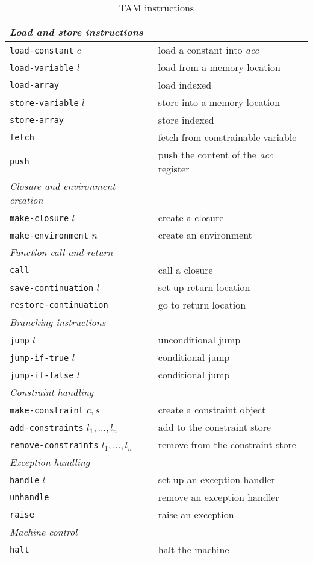 \begin{table}
\begin{center}
\begin{tabular}{|ll|}
\hline
{\em Load and store instructions}&\\
\hline
{\tt load-constant} $c$& load a constant into {\em acc}\\
{\tt load-variable} $l$& load from a memory location\\
{\tt load-array} & load indexed\\
{\tt store-variable} $l$& store into a memory location\\
{\tt store-array} & store indexed\\
{\tt fetch} & fetch from constrainable variable\\
{\tt push} & push the content of the {\em acc} register\\
\hline
{\em Closure and environment creation}&\\
\hline
{\tt make-closure} $l$& create a closure\\
{\tt make-environment} $n$& create an environment\\
\hline
{\em Function call and return}&\\
\hline
{\tt call} & call a closure\\
{\tt save-continuation} $l$& set up return location\\
{\tt restore-continuation} & go to return location\\
\hline
{\em Branching instructions}&\\
\hline
{\tt jump} $l$& unconditional jump\\
{\tt jump-if-true} $l$& conditional jump\\
{\tt jump-if-false} $l$& conditional jump\\
\hline
{\em Constraint handling}&\\
\hline
{\tt make-constraint} $c, s$& create a constraint object\\
{\tt add-constraints} $l_1,\dots,l_n$& add to the constraint store\\
{\tt remove-constraints} $l_1,\dots,l_n$& remove from the constraint store\\
\hline
{\em Exception handling}&\\
\hline
{\tt handle} $l$& set up an exception handler\\
{\tt unhandle} & remove an exception handler\\
{\tt raise} & raise an exception\\
\hline
{\em Machine control}&\\
\hline
{\tt halt} & halt the machine\\
\hline
\end{tabular}
\end{center}
\caption{TAM instructions}
\label{tab:tam-instructions}
\end{table}

